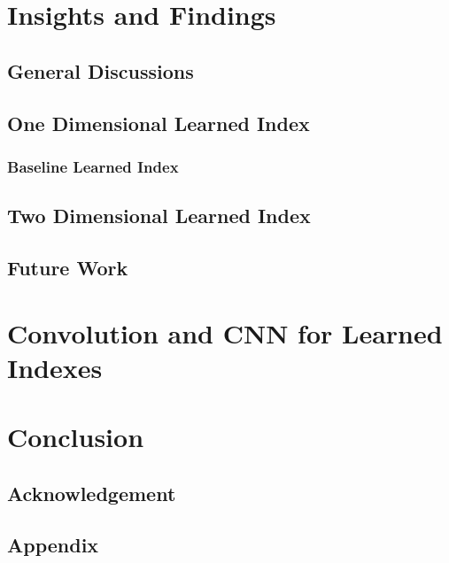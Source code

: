 \documentclass[a4paper,12pt]{scrreprt}
\newcounter{conclusion}[chapter]
\begin{document}


\chapter{Insights and Findings}

\section{General Discussions}



\section{One Dimensional Learned Index}

\subsection{Baseline Learned Index}



\section{Two Dimensional Learned Index}



\section{Future Work}

\chapter{Convolution and CNN for Learned Indexes}



\chapter{Conclusion}



\section*{Acknowledgement}



\begin{appendices}
\chapter{Appendix}


\end{appendices}




\end{document}
